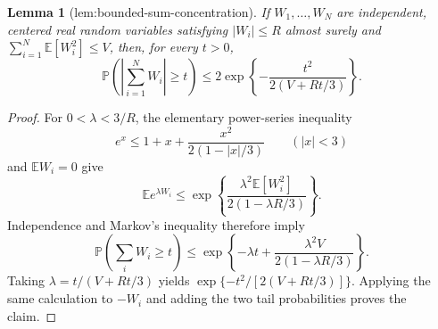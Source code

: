 \documentclass{article}
\newtheorem{lemma}{Lemma}
\begin{document}
\begin{lemma}[lem:bounded-sum-concentration]\label{lem:bounded-sum-concentration}
If \(W_1,\ldots,W_N\) are independent, centered real random variables satisfying \(|W_i|\le R\) almost surely and \(\sum_{i=1}^N\mathbb E[W_i^2]\le V\), then, for every \(t>0\),
\[
\mathbb P\left(\left|\sum_{i=1}^NW_i\right|\ge t\right)\le2\exp\left\{-\frac{t^2}{2(V+Rt/3)}\right\}.
\]
\end{lemma}
\begin{proof}
For \(0<\lambda<3/R\), the elementary power-series inequality
\[
e^x\le1+x+\frac{x^2}{2(1-|x|/3)}\qquad(|x|<3)
\]
and \(\mathbb E W_i=0\) give
\[
\mathbb E e^{\lambda W_i}\le\exp\left\{\frac{\lambda^2\mathbb E[W_i^2]}{2(1-\lambda R/3)}\right\}.
\]
Independence and Markov's inequality therefore imply
\[
\mathbb P\left(\sum_iW_i\ge t\right)\le\exp\left\{-\lambda t+\frac{\lambda^2V}{2(1-\lambda R/3)}\right\}.
\]
Taking \(\lambda=t/(V+Rt/3)\) yields \(\exp\{-t^2/[2(V+Rt/3)]\}\). Applying the same calculation to \(-W_i\) and adding the two tail probabilities proves the claim.
\end{proof}
\end{document}

